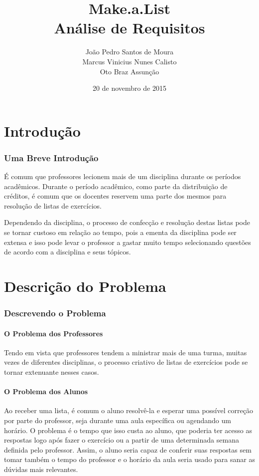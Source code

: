\documentclass[12pt,oneside,a4paper,article]{abntex2}
\title{Make.a.List\\Análise de Requisitos}
\author{João Pedro Santos de Moura\\
		Marcus Vinicius Nunes Calisto\\
		Oto Braz Assunção}
\date{20 de novembro de 2015}
\begin{document}
\maketitle

\pagebreak

\tableofcontents

\pagebreak

\listoffigures

\pagebreak

\listoftables

\part{Introdução}
\section{Uma Breve Introdução}
	É comum que professores lecionem mais de um disciplina durante os períodos acadêmicos.
	Durante o período acadêmico, como parte da distribuição de créditos, é comum que os docentes reservem uma parte dos mesmos para resolução de listas de exercícios.

	Dependendo da disciplina, o processo de confecção e resolução destas listas pode se tornar custoso em relação ao tempo, pois a ementa da disciplina pode ser extensa e isso pode levar o professor a gastar muito tempo selecionando questões de acordo com a disciplina e seus tópicos.

\part{Descrição do Problema}
	\section{Descrevendo o Problema}
		\subsection{O Problema dos Professores}
			Tendo em vista que professores tendem a ministrar mais de uma turma, muitas vezes de diferentes disciplinas, o processo criativo de listas de exercícios pode se tornar extenuante nesses casos.
		
		\subsection{O Problema dos Alunos}
			Ao receber uma lista, é comum o aluno resolvê-la e esperar uma possível correção por parte do professor, seja durante uma aula específica ou agendando um horário.
			O problema é o tempo que isso custa ao aluno, que poderia ter acesso as respostas logo após fazer o exercício ou a partir de uma determinada semana definida pelo
			professor. Assim, o aluno seria capaz de conferir suas respostas sem tomar também o tempo do professor e o horário da aula seria usado para sanar as dúvidas
			mais relevantes.
			
\end{document}
